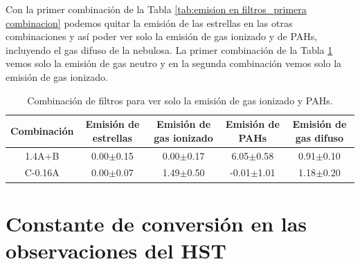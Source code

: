\documentclass{book}
\begin{document}
Con la primer combinación de la Tabla \ref{tab:emision en filtros_primera combinacion} podemos quitar la emisión de las estrellas en las otras combinaciones y así poder ver solo la emisión de gas ionizado y de PAHs, incluyendo el gas difuso de la nebulosa. La primer combinación de la Tabla \ref{tab:emision en filtros_segunda combinacion} vemos solo la emisión de gas neutro y en la segunda combinación vemos solo la emisión de gas ionizado.
\begin{table}[htb]
    \centering
    \begin{tabular}{c c c c c}
        \toprule
        Combinación & Emisión de estrellas & Emisión de gas ionizado & Emisión de PAHs & Emisión de gas difuso \\
        \midrule
         1.4A+B & 0.00$\pm$0.15 & 0.00$\pm$0.17 & 6.05$\pm$0.58 & 0.91$\pm$0.10\\
         C-0.16A & 0.00$\pm$0.07 & 1.49$\pm$0.50 & -0.01$\pm$1.01 & 1.18$\pm$0.20 \\
         \bottomrule
    \end{tabular}
    \caption{Combinación de filtros para ver solo la emisión de gas ionizado y PAHs.}
    \label{tab:emision en filtros_segunda combinacion}
\end{table}

\chapter{Constante de conversión en las observaciones del HST} \label{AP : conversion EM}
\end{document}
